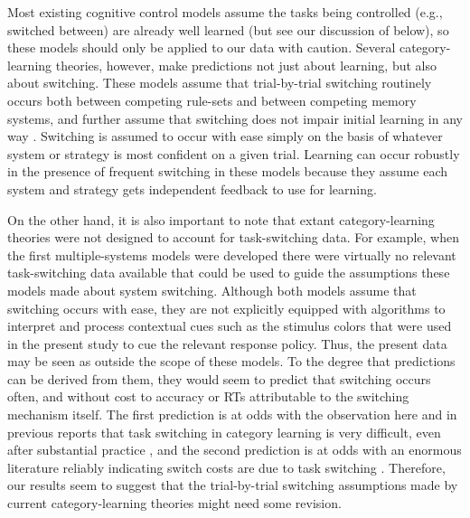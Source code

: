\documentclass[doc, floatsintext]{apa7}
\begin{document}
Most existing cognitive control models assume the tasks
being controlled (e.g., switched between) are already well
learned \parencite{botvinick_conflict_2001,
    gilbert_task_2002, blais_item-specific_2007,
    brown_computational_2007, verguts_hebbian_2008,
abrahamse_grounding_2016} (but see our discussion of
\cite{collins_cognitive_2013} below), so these models should
only be applied to our data with caution. Several
category-learning theories, however, make predictions not
just about learning, but also about switching. These models
assume that trial-by-trial switching routinely occurs both
between competing rule-sets and between competing memory
systems, and further assume that switching does not impair
initial learning in any way
\parencite{ashby_neuropsychological_1998,
erickson_rules_1998}. Switching is assumed to occur with
ease simply on the basis of whatever system or strategy is
most confident on a given trial. Learning can occur robustly
in the presence of frequent switching in these models
because they assume each system and strategy gets
independent feedback to use for learning.

On the other hand, it is also important to note that extant
category-learning theories were not designed to account for
task-switching data. For example, when the first
multiple-systems models were developed
\parencite{ashby_neuropsychological_1998,
erickson_rules_1998} there were virtually no relevant
task-switching data available that could be used to guide
the assumptions these models made about system switching.
Although both models assume that switching occurs with ease,
they are not explicitly equipped with algorithms to
interpret and process contextual cues such as the stimulus
colors that were used in the present study to cue the
relevant response policy. Thus, the present data may be seen
as outside the scope of these models. To the degree that
predictions can be derived from them, they would seem to
predict that switching occurs often, and without cost to
accuracy or RTs attributable to the switching mechanism
itself. The first prediction is at odds with the observation
here and in previous reports that task switching in category
learning is very difficult, even after substantial practice
\parencite{crossley_trial-by-trial_2018,
erickson_executive_2008, turner_hierarchical_2017}, and the
second prediction is at odds with an enormous literature
reliably indicating switch costs are due to task switching
\parencite{kiesel_control_2010, monsell_task_2003}.
Therefore, our results seem to suggest that the
trial-by-trial switching assumptions made by current
category-learning theories might need some revision. 
\end{document}

